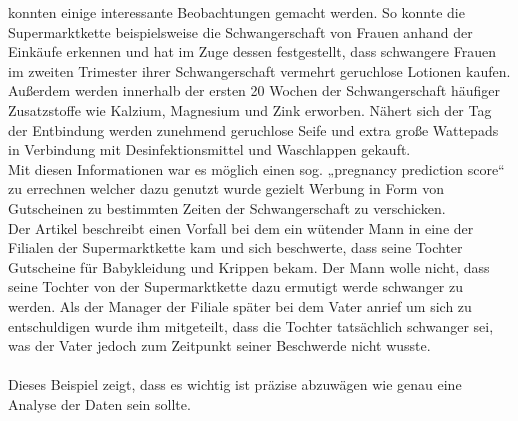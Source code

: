 konnten einige interessante Beobachtungen gemacht werden. So konnte die
Supermarktkette beispielsweise die Schwangerschaft von Frauen anhand der
Einkäufe erkennen und hat im Zuge dessen festgestellt, dass schwangere Frauen
im zweiten Trimester ihrer Schwangerschaft vermehrt geruchlose Lotionen kaufen.
Außerdem werden innerhalb der ersten 20 Wochen der Schwangerschaft häufiger
Zusatzstoffe wie Kalzium, Magnesium und Zink erworben. Nähert sich der Tag der
Entbindung werden zunehmend geruchlose Seife und extra große Wattepads in
Verbindung mit Desinfektionsmittel und Waschlappen gekauft. \\
Mit diesen Informationen war es möglich einen sog. „pregnancy prediction score“
zu errechnen welcher dazu genutzt wurde gezielt Werbung in Form von Gutscheinen
zu bestimmten Zeiten der Schwangerschaft zu verschicken. \\
Der Artikel beschreibt einen Vorfall bei dem ein wütender Mann in eine der
Filialen der Supermarktkette kam und sich beschwerte, dass seine Tochter
Gutscheine für Babykleidung und Krippen bekam. Der Mann wolle nicht, dass seine
Tochter von der Supermarktkette dazu ermutigt werde schwanger zu werden. Als
der Manager der Filiale später bei dem Vater anrief um sich zu entschuldigen
wurde ihm mitgeteilt, dass die Tochter tatsächlich schwanger sei, was der Vater
jedoch zum Zeitpunkt seiner Beschwerde nicht wusste. \\
\\
Dieses Beispiel zeigt, dass es wichtig ist präzise abzuwägen wie genau eine
Analyse der Daten sein sollte. \\
